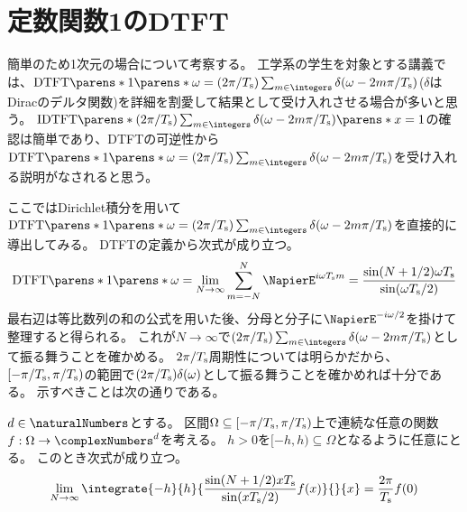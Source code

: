     \section{定数関数1のDTFT}
        \label{定数関数1のDTFT}
        簡単のため1次元の場合について考察する。
        工学系の学生を対象とする講義では、$\DTFTwithArg{1}{\omega} = (2\pi/\Ts)\sum_{m\in\integers}\delta(\omega-2m\pi/\Ts)$($\delta$はDiracのデルタ関数)を詳細を割愛して結果として受け入れさせる場合が多いと思う。
        $\IDTFTwithArg{(2\pi/\Ts)\sum_{m\in\integers}\delta(\omega-2m\pi/\Ts)}{x}=1$の確認は簡単であり、DTFTの可逆性から$\DTFTwithArg{1}{\omega} = (2\pi/\Ts)\sum_{m\in\integers}\delta(\omega-2m\pi/\Ts)$を受け入れる説明がなされると思う。
        \par
        ここではDirichlet積分を用いて$\DTFTwithArg{1}{\omega} = (2\pi/\Ts)\sum_{m\in\integers}\delta(\omega-2m\pi/\Ts)$を直接的に導出してみる。
        DTFTの定義から次式が成り立つ。
        \[
            \DTFTwithArg{1}{\omega} = \lim_{N\to\infty} \sum_{m=-N}^N \NapierE^{i\omega \Ts m} = \frac{\sin(N+1/2)\omega \Ts}{\sin(\omega \Ts/2)}
        \]
        最右辺は等比数列の和の公式を用いた後、分母と分子に$\NapierE^{-i\omega/2}$を掛けて整理すると得られる。
        これが$N\to\infty$で$(2\pi/\Ts)\sum_{m\in\integers}\delta(\omega-2m\pi/\Ts)$として振る舞うことを確かめる。
        $2\pi/T_\text{s}$周期性については明らかだから、$[-\pi/T_\text{s},\pi/T_\text{s})$の範囲で$(2\pi/T_\text{s})\delta(\omega)$として振る舞うことを確かめれば十分である。
        示すべきことは次の通りである。
        \begin{shadebox}
            $d\in\naturalNumbers$とする。
            区間$\Omega \subseteq [-\pi/T_\text{s},\pi/T_\text{s})$上で連続な任意の関数$f:\Omega\to\complexNumbers^d$を考える。
            $h>0$を$[-h,h) \subseteq \Omega$となるように任意にとる。
            このとき次式が成り立つ。
            \[
                \lim_{N\to\infty} \integrate{-h}{h}{\frac{\sin(N+1/2)x \Ts}{\sin(x \Ts/2)} f(x)}{}{x} = \frac{2\pi}{\Ts} f(0)
            \]
        \end{shadebox}
